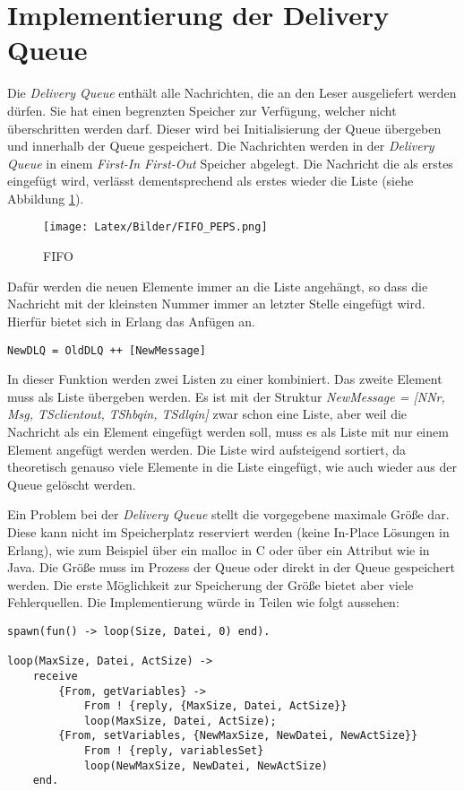 \section{Implementierung der Delivery Queue} \label{dlq}

Die \textit{Delivery Queue} enthält alle Nachrichten, die an den Leser ausgeliefert werden dürfen. Sie hat einen begrenzten Speicher zur Verfügung, welcher nicht überschritten werden darf. Dieser wird bei Initialisierung der Queue übergeben und innerhalb der Queue gespeichert. Die Nachrichten werden in der \textit{Delivery Queue} in einem \textit{First-In First-Out} Speicher abgelegt. Die Nachricht die als erstes eingefügt wird, verlässt dementsprechend als erstes wieder die Liste (siehe Abbildung \ref{fig:fifo}).

\begin{figure}[htbp]
\begin{center}
\texttt{[image: Latex/Bilder/FIFO\_PEPS.png]}
\caption[First In First Out]{FIFO\footnotemark}\label{fig:fifo}
\end{center}
\end{figure}

Dafür werden die neuen Elemente immer an die Liste angehängt, so dass die Nachricht mit der kleinsten Nummer immer an letzter Stelle eingefügt wird. Hierfür bietet sich in Erlang das Anfügen an. 

\begin{lstlisting}
NewDLQ = OldDLQ ++ [NewMessage]
\end{lstlisting}

In dieser Funktion werden zwei Listen zu einer kombiniert. Das zweite Element muss als Liste übergeben werden. Es ist mit der Struktur \textit{NewMessage = [NNr, Msg, TSclientout, TShbqin, TSdlqin]} zwar schon eine Liste, aber weil die Nachricht als ein Element eingefügt werden soll, muss es als Liste mit nur einem Element angefügt werden werden. 
Die Liste wird aufsteigend sortiert, da theoretisch genauso viele Elemente in die Liste eingefügt, wie auch wieder aus der Queue gelöscht werden. 

Ein Problem bei der \textit{Delivery Queue} stellt die vorgegebene maximale Größe dar. Diese kann nicht im Speicherplatz reserviert werden (keine In-Place Lösungen in Erlang), wie zum Beispiel über ein malloc in C oder über ein Attribut wie in Java. Die Größe muss im Prozess der Queue oder direkt in der Queue gespeichert werden.
Die erste Möglichkeit zur Speicherung der Größe bietet aber viele Fehlerquellen. Die Implementierung würde in Teilen wie folgt aussehen:
\begin{lstlisting}
spawn(fun() -> loop(Size, Datei, 0) end).

loop(MaxSize, Datei, ActSize) -> 
    receive 
        {From, getVariables} -> 
            From ! {reply, {MaxSize, Datei, ActSize}}
            loop(MaxSize, Datei, ActSize);
        {From, setVariables, {NewMaxSize, NewDatei, NewActSize}}
            From ! {reply, variablesSet}
            loop(NewMaxSize, NewDatei, NewActSize)
    end.
\end{lstlisting}

